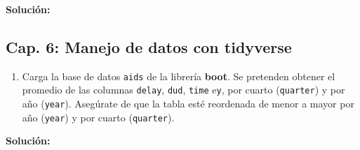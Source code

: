 \documentclass[
]{article}
\newenvironment{Shaded}{\begin{snugshade}}{\end{snugshade}}
\newcommand{\AttributeTok}[1]{\textcolor[rgb]{0.77,0.63,0.00}{#1}}
\newcommand{\CommentTok}[1]{\textcolor[rgb]{0.56,0.35,0.01}{\textit{#1}}}
\newcommand{\ControlFlowTok}[1]{\textcolor[rgb]{0.13,0.29,0.53}{\textbf{#1}}}
\newcommand{\DecValTok}[1]{\textcolor[rgb]{0.00,0.00,0.81}{#1}}
\newcommand{\FunctionTok}[1]{\textcolor[rgb]{0.00,0.00,0.00}{#1}}
\newcommand{\NormalTok}[1]{#1}
\providecommand{\tightlist}{%
  \setlength{\itemsep}{0pt}\setlength{\parskip}{0pt}}
\theoremstyle{definition}
\theoremstyle{definition}
\theoremstyle{definition}
\theoremstyle{definition}
\theoremstyle{remark}
\begin{document}
\textbf{Solución:}

\begin{Shaded}
\end{Shaded}

\hypertarget{cap.-6-manejo-de-datos-con-tidyverse}{%
\subsection{Cap. 6: Manejo de datos con tidyverse}\label{cap.-6-manejo-de-datos-con-tidyverse}}

\begin{enumerate}
\def\labelenumi{\arabic{enumi}.}
\tightlist
\item
  Carga la base de datos \texttt{aids} de la librería \textbf{boot}. Se pretenden obtener el promedio de las columnas \texttt{delay}, \texttt{dud}, \texttt{time} e\texttt{y}, por cuarto (\texttt{quarter}) y por año (\texttt{year}). Asegúrate de que la tabla esté reordenada de menor a mayor por año (\texttt{year}) y por cuarto (\texttt{quarter}).
\end{enumerate}

\textbf{Solución:}
\end{document}

